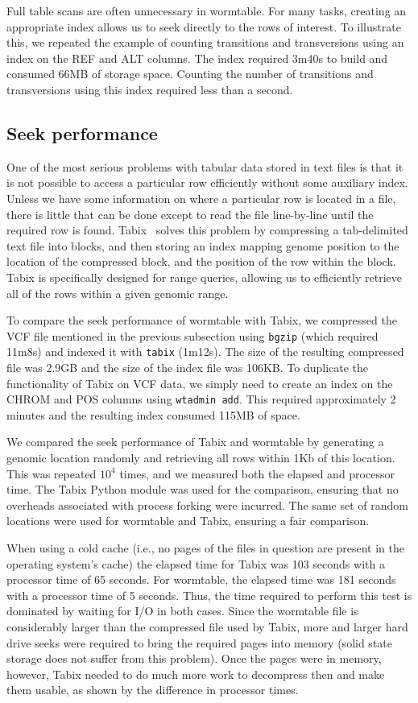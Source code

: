 \documentclass[10pt]{bmc_article}
\newenvironment{bmcformat}{\begin{raggedright}\baselineskip20pt\sloppy\setboolean{publ}{false}}{\end{raggedright}\baselineskip20pt\sloppy}
\begin{document}
\begin{bmcformat}
Full table scans are often unnecessary in wormtable. For many tasks,
creating an appropriate index allows us to seek directly to the 
rows of interest. To illustrate this, we repeated the example 
of counting transitions and transversions using an index 
on the REF and ALT columns.
The index required 3m40s to build and 
consumed 66MB of storage space. Counting the number of 
transitions and transversions using this index required 
less than a second.

\subsection*{Seek performance}
One of the most serious problems with tabular data stored in text files
is that it is not possible to access a particular row 
efficiently without some auxiliary 
index. Unless we have some information on where a particular row is located
in a file, there is little that can be done except to read the file 
line-by-line until the required row is found. Tabix~\cite{li11} solves
this problem by compressing a tab-delimited text file into blocks, and 
then storing an index mapping genome position to the location 
of the compressed block, and the position of the row within the block.
Tabix is specifically designed for range queries, allowing us to 
efficiently retrieve all of the rows within a given genomic range.

To compare the seek performance of wormtable with Tabix, we compressed
the VCF file mentioned in the previous subsection using \texttt{bgzip}
(which required 11m8s) and indexed it with \texttt{tabix} (1m12s). 
The size of the resulting compressed file was 2.9GB and 
the size of the index file was 106KB.
To duplicate the functionality of Tabix on VCF data, we simply need to 
create an index on the CHROM and POS columns using \texttt{wtadmin add}. 
This required approximately
2 minutes and the resulting index consumed 115MB of space.

We compared the seek performance of Tabix and wormtable by generating 
a genomic location randomly and retrieving all rows within 1Kb of
this location. This 
was repeated $10^4$ times, and we measured both the elapsed and 
processor time. The Tabix Python module was used for the 
comparison, ensuring that no overheads associated with process 
forking were incurred. The same set of random locations were used 
for wormtable and Tabix, ensuring a fair comparison.

When using a cold cache (i.e., no pages of the files in question are 
present in the operating system's cache) the elapsed
time for Tabix was 103 seconds with a processor time of 65
seconds. For wormtable, the elapsed time was 181 seconds 
with a processor time of 5 seconds. Thus, the time required 
to perform this test is dominated by waiting for I/O in both 
cases. Since the wormtable file is considerably larger than the 
compressed file used by Tabix, more and larger hard drive
seeks were required 
to bring the required pages into memory (solid state 
storage does not suffer from this problem). Once the 
pages were in memory, however, Tabix needed to do much more work to 
decompress then and make them usable, as shown by the 
difference in processor times.


\end{bmcformat}
\end{document}

